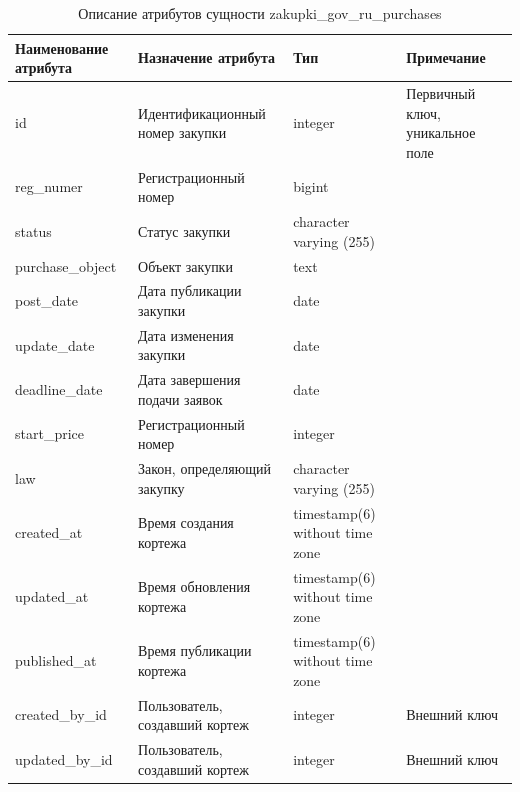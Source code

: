 \documentclass{mirea}
\begin{document}
	\begin{longtable}{ |p{}|p{}|p{}|p{}| } 
		\caption{Описание атрибутов сущности zakupki\_gov\_ru\_purchases}
		\label{tab:attributes_last_table}
		\endfirsthead
		\endhead
		\hline
		Наименование атрибута & Назначение атрибута & Тип & Примечание \\ \hline
		
		id & Идентификацион\-ный номер закупки & integer & Первичный ключ, уникальное поле \\ \hline
		
		reg\_numer & Регистрационный номер & bigint & \\ \hline
		
		status & Статус закупки & character varying (255) & \\ \hline
		
		purchase\_object & Объект закупки & text & \\ \hline
		
		post\_date & Дата публикации закупки  & date & \\ \hline
		
		update\_date & Дата изменения закупки  & date & \\ \hline
		
		deadline\_date & Дата завершения подачи заявок & date & \\ \hline
		
		start\_price & Регистрационный номер & integer & \\ \hline
		
		law & Закон, определяющий закупку & character varying (255) & \\ \hline
		
		created\_at & Время создания кортежа & timestamp(6) without time zone & \\ \hline
		
		updated\_at & Время обновления кортежа & timestamp(6) without time zone & \\ \hline
		
		published\_at & Время публикации кортежа & timestamp(6) without time zone & \\ \hline
		
		created\_by\_id & Пользователь, создавший кортеж & integer & Внешний ключ \\ \hline
		
		updated\_by\_id & Пользователь, создавший кортеж & integer & Внешний ключ \\ \hline
		
	\end{longtable}
	
\end{document}
